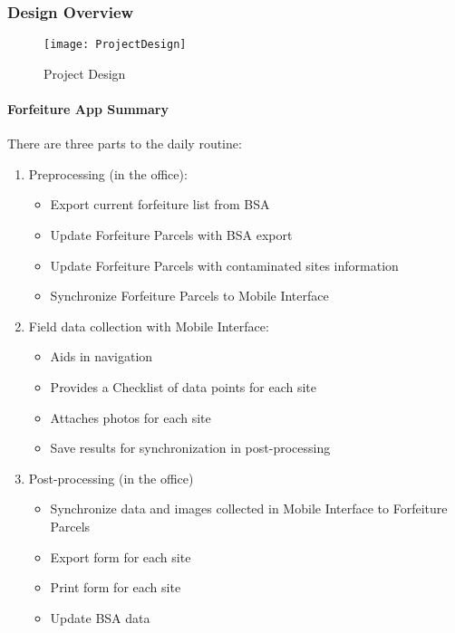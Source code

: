  \subsubsection{Design Overview}
 \vspace{-.2in}

 \begin{figure}[h!]
 \centering
     \texttt{[image: ProjectDesign]}
 \vspace{-.2in}

 \caption{Project Design}
 \end{figure}
 \clearpage
 \paragraph{Forfeiture App Summary}
 \vspace{.25in}

 There are {\LARGE three parts} to the daily routine:
 \vspace{.25in}

 \begin{enumerate}
 \item \Large Preprocessing \normalsize(in the office):
 \begin{itemize}
 \item Export current forfeiture list from BSA
 \item Update Forfeiture Parcels with BSA export
 \item Update Forfeiture Parcels with contaminated sites information
 \item Synchronize Forfeiture Parcels to Mobile Interface
 \end{itemize}
 \item \Large Field data collection \normalsize with Mobile Interface:
 \begin{itemize}
 \item Aids in navigation
 \item Provides a Checklist of data points for each site
 \item Attaches photos for each site
 \item Save results for synchronization in post-processing
 \end{itemize}
 \item \Large Post-processing \normalsize (in the office)
 \begin{itemize}
 \item Synchronize data and images collected in Mobile Interface to Forfeiture Parcels
 \item Export form for each site
 \item Print form for each site
 \item Update BSA data
 \end{itemize}
 \end{enumerate}
 \clearpage
